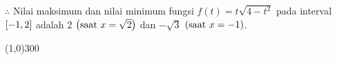 \begin{enumerate}[leftmargin=*, label={\arabic*}.]
$\therefore$ Nilai maksimum dan nilai minimum fungsi $f(t)=t\sqrt{4-t^2}$ pada 
interval $\cic{-1,2}$ adalah $2$ $\brk*{\text{saat $x = \sqrt{2}$}}$ 
dan $-\sqrt{3}$ $\brk*{\text{saat $x = -1$}}$.
\end{enumerate}
\begin{center}
    \line(1,0){300}
\end{center}